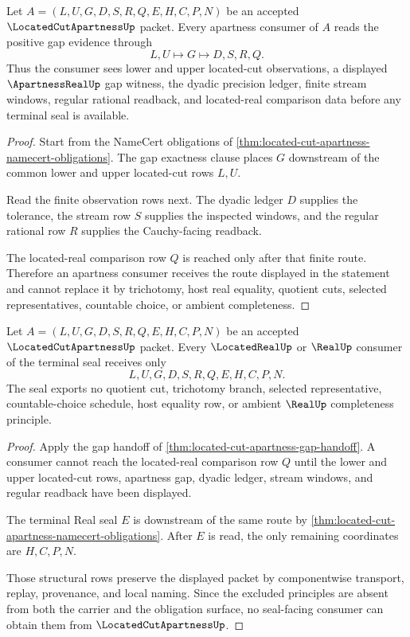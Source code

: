 \begin{theorem}
\label{thm:located-cut-apartness-gap-handoff}
Let $A=(L,U,G,D,S,R,Q,E,H,C,P,N)$ be an accepted $\LocatedCutApartnessUp$ packet. Every apartness consumer of $A$ reads the positive gap evidence through
$$
L,U \longmapsto G \longmapsto D,S,R,Q .
$$
Thus the consumer sees lower and upper located-cut observations, a displayed $\ApartnessRealUp$ gap witness, the dyadic precision ledger, finite stream windows, regular rational readback, and located-real comparison data before any terminal seal is available.
\end{theorem}
\begin{proof}
Start from the NameCert obligations of \autoref{thm:located-cut-apartness-namecert-obligations}. The gap exactness clause places $G$ downstream of the common lower and upper located-cut rows $L,U$.

Read the finite observation rows next. The dyadic ledger $D$ supplies the tolerance, the stream row $S$ supplies the inspected windows, and the regular rational row $R$ supplies the Cauchy-facing readback.

The located-real comparison row $Q$ is reached only after that finite route. Therefore an apartness consumer receives the route displayed in the statement and cannot replace it by trichotomy, host real equality, quotient cuts, selected representatives, countable choice, or ambient completeness.
\end{proof}

\begin{theorem}
\label{thm:located-cut-apartness-real-seal-nonescape}
Let $A=(L,U,G,D,S,R,Q,E,H,C,P,N)$ be an accepted $\LocatedCutApartnessUp$ packet. Every $\LocatedRealUp$ or $\RealUp$ consumer of the terminal seal receives only
$$
L,U,G,D,S,R,Q,E,H,C,P,N .
$$
The seal exports no quotient cut, trichotomy branch, selected representative, countable-choice schedule, host equality row, or ambient $\RealUp$ completeness principle.
\end{theorem}
\begin{proof}
Apply the gap handoff of \autoref{thm:located-cut-apartness-gap-handoff}. A consumer cannot reach the located-real comparison row $Q$ until the lower and upper located-cut rows, apartness gap, dyadic ledger, stream windows, and regular readback have been displayed.

The terminal Real seal $E$ is downstream of the same route by \autoref{thm:located-cut-apartness-namecert-obligations}. After $E$ is read, the only remaining coordinates are $H,C,P,N$.

Those structural rows preserve the displayed packet by componentwise transport, replay, provenance, and local naming. Since the excluded principles are absent from both the carrier and the obligation surface, no seal-facing consumer can obtain them from $\LocatedCutApartnessUp$.
\end{proof}


